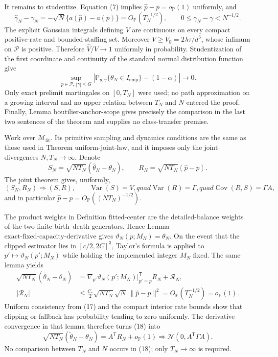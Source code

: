 It remains to studentize.  Equation (7) implies \(\widehat p-p=o_{\mathbb P}(1)\) uniformly, and
\[
 \widehat\gamma_N-\gamma_N
 =-\sqrt N\{a(\widehat p)-a(p)\}=O_{\mathbb P}(T_N^{-1/2}),
 \qquad 0\leq\gamma_N-\gamma<N^{-1/2}.                           \tag{17}
\]
The explicit Gaussian integrals defining \(V\) are continuous on every compact positive-rate and bounded-staffing set.  Moreover
\(V\geq V_0=2\lambda\tau/d^3\), whose infimum on \(\mathcal P\) is positive.  Therefore \(\widehat V/V\to1\) uniformly in probability.  Studentization of the first coordinate and continuity of the standard normal distribution function give
\[
 \sup_{p\in\mathcal P,\,|\gamma|\leq G}
 \left|\mathbb P_{p,\gamma}\{\theta_N\in I_{\mathrm{emp}}\}-(1-\alpha)\right|\longrightarrow0.
\]
Only exact prelimit martingales on \([0,T_N]\) were used; no path approximation on a growing interval and no upper relation between \(T_N\) and \(N\) entered the proof.  Finally, Lemma \(\mathrm{boutilier\mbox{-}anchor\mbox{-}scope}\) gives precisely the comparison in the last two sentences of the theorem and supplies no class-transfer premise.

Work over \(\mathcal M_{\mathrm{fit}}\).  Its primitive sampling and dynamics conditions are the same as those used in Theorem \(\mathrm{uniform\mbox{-}joint\mbox{-}law}\), and it imposes only the joint divergences \(N,T_N\to\infty\).  Denote
\[
 S_N=\sqrt{NT_N}(\widehat\theta_N-\theta_N),
 \qquad R_N=\sqrt{NT_N}(\widehat p-p).
\]
The joint theorem gives, uniformly,
\[
 (S_N,R_N)\Rightarrow(S,R),
 \qquad
 \operatorname{Var}(S)=V,quad
 \operatorname{Var}(R)=\Gamma,quad
 \operatorname{Cov}(R,S)=\Gamma A,                              \tag{17}
\]
and in particular \(\widehat p-p=O_{\mathbb P}((NT_N)^{-1/2})\).

The product weights in Definition \(\mathrm{fitted\mbox{-}center}\) are the detailed-balance weights of the two finite birth--death generators.  Hence Lemma \(\mathrm{exact\mbox{-}fixed\mbox{-}capacity\mbox{-}derivative}\) gives
\(\vartheta_N(p;M_N)=\theta_N\).  On the event that the clipped estimator lies in \([c/2,2C]^3\), Taylor's formula is applied to \(p'\mapsto\vartheta_N(p';M_N)\) while holding the implemented integer \(M_N\) fixed.  The same lemma yields
\[
 \begin{split}
 \sqrt{NT_N}(\widetilde\theta_N-\theta_N)
 &=\nabla_{p'}\vartheta_N(p';M_N)|_{p'=p}^{\mathsf T}R_N+\mathcal R_N,\\
 |\mathcal R_N|
 &\leq \frac{C_*}{2}\sqrt{NT_N}\sqrt N\,\|\widehat p-p\|^2
 =O_{\mathbb P}(T_N^{-1/2})=o_{\mathbb P}(1).                   
 \end{split}                                                     \tag{18}
\]
Uniform consistency from (17) and the compact interior rate bounds show that clipping or fallback has probability tending to zero uniformly.  The derivative convergence in that lemma therefore turns (18) into
\[
 \sqrt{NT_N}(\widetilde\theta_N-\theta_N)
 =A^{\mathsf T}R_N+o_{\mathbb P}(1)
 \Rightarrow\mathcal N(0,A^{\mathsf T}\Gamma A).               \tag{19}
\]
No comparison between \(T_N\) and \(N\) occurs in (18); only \(T_N\to\infty\) is required.

